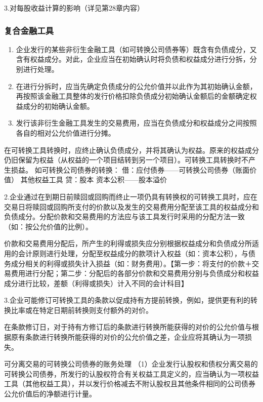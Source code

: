 \documentclass[UTF8,12pt]{ctexart}
\numberwithin{equation}{section} %
\numberwithin{figure}{section}
\numberwithin{table}{section}
\begin{document}
	3.对每股收益计算的影响（详见第28章内容）
	
	\subsubsection{复合金融工具}
	\begin{enumerate}
		\item 企业发行的某些非衍生金融工具（如可转换公司债券等）既含有负债成分，又含有权益成分。对此，企业应当在初始确认时将负债和权益成分进行分拆，分别进行处理。
		
		\item 在进行分拆时，应当先确定负债成分的公允价值并以此作为其初始确认金额，再按照该金融工具整体的发行价格扣除负债成分初始确认金额后的金额确定权益成分的初始确认金额。
		
		\item 发行该非衍生金融工具发生的交易费用，应当在负债成分和权益成分之间按照各自的相对公允价值进行分摊。
	\end{enumerate}
	
	在可转换工具转换时，应终止确认负债成分，并将其确认为权益。原来的权益成分仍旧保留为权益（从权益的一个项目结转到另一个项目）。可转换工具转换时不产生损益。
	如可转换公司债券的转换：
	借：应付债券——可转换公司债券（账面价值）
	其他权益工具
	贷：股本
	资本公积——股本溢价
	
	2.企业通过在到期日前赎回或回购而终止一项仍具有转换权的可转换工具时，应在交易日将赎回或回购所支付的价款以及发生的交易费用分配至该工具的权益成分和负债成分。分配价款和交易费用的方法应与该工具发行时采用的分配方法一致（如：按公允价值的比例）。
	
	价款和交易费用分配后，所产生的利得或损失应分别根据权益成分和负债成分所适用的会计原则进行处理，分配至权益成分的款项计入权益（如：资本公积），与债务成分相关的利得或损失计入损益（如：财务费用）。【第一步：将支付的价款＋交易费用进行分配；第二步：分配后的各部分价款和交易费用分别与负债成分和权益成分进行比较，差额（利得或损失）计入不同的会计科目】
	
	3.企业可能修订可转换工具的条款以促成持有方提前转换，例如，提供更有利的转换比率或在特定日期前转换则支付额外的对价。
	
	在条款修订日，对于持有方修订后的条款进行转换所能获得的对价的公允价值与根据原有条款进行转换所能获得的对价的公允价值之差，企业应将其确认为一项损失。
	
	可分离交易的可转换公司债券的账务处理
	（1）企业发行认股权和债权分离交易的可转换公司债券，所发行的认股权符合有关权益工具定义的，应当确认为一项权益工具（其他权益工具），并以发行价格减去不附认股权且其他条件相同的公司债券公允价值后的净额进行计量。
	
\end{document}
